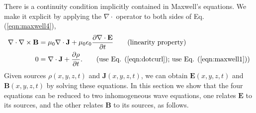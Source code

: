 \documentclass[11pt]{article}              %
\begin{document}
There is a continuity condition implicitly contained in Maxwell's equations. We make it explicit by applying the $\nabla\cdot$ operator to both sides of Eq. (\ref{eqn:maxwell4}),
\begin{align}
    \nabla\cdot\nabla\times {\mathbf B}&=\mu_0\nabla\cdot{\mathbf J}+\mu_0\epsilon_0\frac{\partial \nabla\cdot{\mathbf E}}{\partial t}\tag{linearity property}\\
    0&=\nabla\cdot{\mathbf J}+\frac{\partial \rho}{\partial t}.\tag{use Eq. (\ref{eqn:dotcurl}); use Eq. (\ref{eqn:maxwell1})}
\end{align}
Given sources $\rho(x,y,z,t)$ and ${\mathbf J}(x,y,z,t)$, we can obtain ${\mathbf E}(x,y,z,t)$ and ${\mathbf B}(x,y,z,t)$ by solving these equations. In this section we show that the four equations can be reduced to two inhomogeneous wave equations, one relates ${\mathbf E}$ to its sources, and the other relates ${\mathbf B}$ to its sources, as follows.
\end{document}
